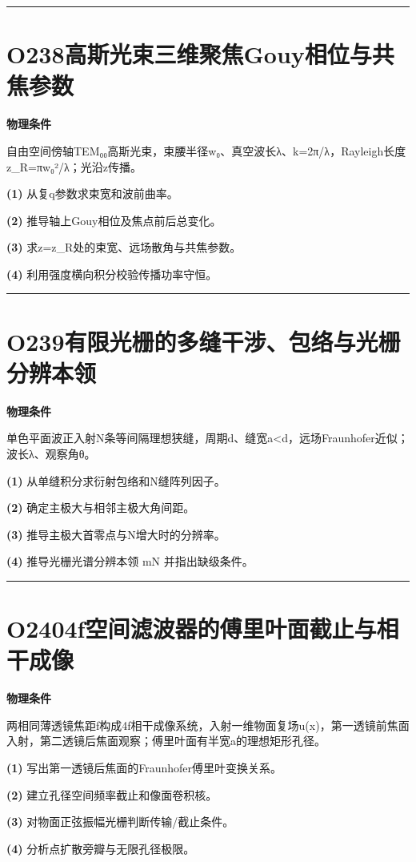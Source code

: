 \documentclass[UTF8,a4paper,11pt,oneside,openany]{ctexbook}
\begin{document}
\par\bigskip\hrule\bigskip
\section*{O238\quad 高斯光束三维聚焦Gouy相位与共焦参数}
\textbf{物理条件}\par 自由空间傍轴TEM₀₀高斯光束，束腰半径w₀、真空波长λ、k=2π/λ，Rayleigh长度z\_R=πw₀²/λ；光沿z传播。
\par\noindent\textbf{(1)} 从复q参数求束宽和波前曲率。
\par\noindent\textbf{(2)} 推导轴上Gouy相位及焦点前后总变化。
\par\noindent\textbf{(3)} 求z=z\_R处的束宽、远场散角与共焦参数。
\par\noindent\textbf{(4)} 利用强度横向积分校验传播功率守恒。

\par\bigskip\hrule\bigskip
\section*{O239\quad 有限光栅的多缝干涉、包络与光栅分辨本领}
\textbf{物理条件}\par 单色平面波正入射N条等间隔理想狭缝，周期d、缝宽a<d，远场Fraunhofer近似；波长λ、观察角θ。
\par\noindent\textbf{(1)} 从单缝积分求衍射包络和N缝阵列因子。
\par\noindent\textbf{(2)} 确定主极大与相邻主极大角间距。
\par\noindent\textbf{(3)} 推导主极大首零点与N增大时的分辨率。
\par\noindent\textbf{(4)} 推导光栅光谱分辨本领 mN 并指出缺级条件。

\par\bigskip\hrule\bigskip
\section*{O240\quad 4f空间滤波器的傅里叶面截止与相干成像}
\textbf{物理条件}\par 两相同薄透镜焦距f构成4f相干成像系统，入射一维物面复场u(x)，第一透镜前焦面入射，第二透镜后焦面观察；傅里叶面有半宽a的理想矩形孔径。
\par\noindent\textbf{(1)} 写出第一透镜后焦面的Fraunhofer傅里叶变换关系。
\par\noindent\textbf{(2)} 建立孔径空间频率截止和像面卷积核。
\par\noindent\textbf{(3)} 对物面正弦振幅光栅判断传输/截止条件。
\par\noindent\textbf{(4)} 分析点扩散旁瓣与无限孔径极限。
\end{document}
